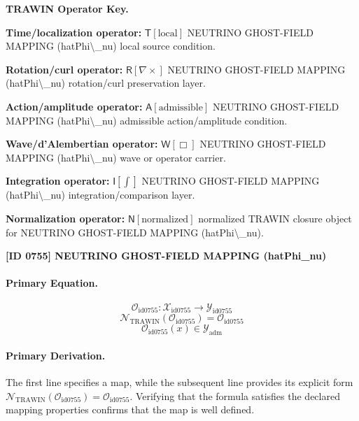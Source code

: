 \par\vspace{0.45\baselineskip}
\noindent\begin{minipage}[t]{\linewidth}
\begingroup
\small
\raggedright
\textbf{TRAWIN Operator Key.}\par
\noindent\textbf{Time/localization operator:} $\mathsf{T}\!\left[\mathrm{local}\right]$ NEUTRINO GHOST-FIELD MAPPING (hatPhi\textbackslash{}\_nu) local source condition.\par
\noindent\textbf{Rotation/curl operator:} $\mathsf{R}\!\left[\nabla\times\right]$ NEUTRINO GHOST-FIELD MAPPING (hatPhi\textbackslash{}\_nu) rotation/curl preservation layer.\par
\noindent\textbf{Action/amplitude operator:} $\mathsf{A}\!\left[\mathrm{admissible}\right]$ NEUTRINO GHOST-FIELD MAPPING (hatPhi\textbackslash{}\_nu) admissible action/amplitude condition.\par
\noindent\textbf{Wave/d'Alembertian operator:} $\mathsf{W}\!\left[\Box\right]$ NEUTRINO GHOST-FIELD MAPPING (hatPhi\textbackslash{}\_nu) wave or operator carrier.\par
\noindent\textbf{Integration operator:} $\mathsf{I}\!\left[\int\right]$ NEUTRINO GHOST-FIELD MAPPING (hatPhi\textbackslash{}\_nu) integration/comparison layer.\par
\noindent\textbf{Normalization operator:} $\mathsf{N}\!\left[\mathrm{normalized}\right]$ normalized TRAWIN closure object for NEUTRINO GHOST-FIELD MAPPING (hatPhi\textbackslash{}\_nu).\par
\endgroup
\end{minipage}

\clearpage
\noindent\textbf{[ID 0755] NEUTRINO GHOST-FIELD MAPPING (hatPhi\_nu)}\par
\vspace{0.35em}
\paragraph{Primary Equation.}
\[
\mathcal{O}_{\mathrm{id0755}}:\mathcal{X}_{\mathrm{id0755}}\longrightarrow\mathcal{Y}_{\mathrm{id0755}}
\]
\[
\mathcal{N}_{\mathrm{TRAWIN}}(\mathcal{O}_{\mathrm{id0755}})=\mathcal{O}_{\mathrm{id0755}}
\]
\[
\mathcal{O}_{\mathrm{id0755}}(x)\in\mathcal{Y}_{\mathrm{adm}}
\]

\paragraph{Primary Derivation.}
The first line specifies a map, while the subsequent line provides its explicit form \( \mathcal{N}_{\mathrm{TRAWIN}}(\mathcal{O}_{\mathrm{id0755}})=\mathcal{O}_{\mathrm{id0755}} \). Verifying that the formula satisfies the declared mapping properties confirms that the map is well defined.
